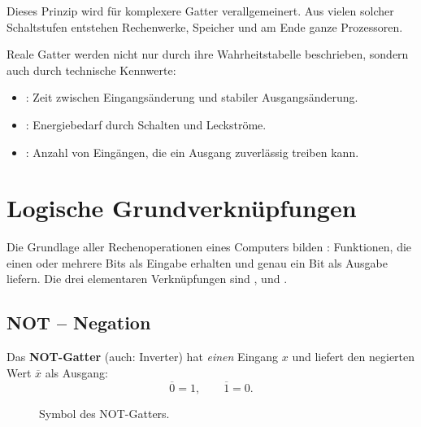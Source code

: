 Dieses Prinzip wird für komplexere Gatter verallgemeinert. Aus vielen solcher Schaltstufen entstehen Rechenwerke, Speicher und am Ende ganze Prozessoren.

\begin{mydefinition}
    Reale Gatter werden nicht nur durch ihre Wahrheitstabelle beschrieben, sondern auch durch technische Kennwerte:
    \begin{itemize}
        \item {}: Zeit zwischen Eingangsänderung und stabiler Ausgangsänderung.
        \item {}: Energiebedarf durch Schalten und Leckströme.
        \item {}: Anzahl von Eingängen, die ein Ausgang zuverlässig treiben kann.
    \end{itemize}
\end{mydefinition}

\section{Logische Grundverknüpfungen}

Die Grundlage aller Rechenoperationen eines Computers bilden : Funktionen, die einen oder mehrere Bits als Eingabe erhalten und genau ein Bit als Ausgabe liefern. Die drei elementaren Verknüpfungen sind ,  und .

\subsection{NOT -- Negation}

\begin{mydefinition}
    Das \textbf{NOT-Gatter} (auch: Inverter) hat \emph{einen} Eingang $x$ und liefert den negierten Wert $\overline{x}$ als Ausgang:
    \[
        \overline{0} = 1, \qquad \overline{1} = 0.
    \]
\end{mydefinition}

\begin{figure}[H]
    \centering
    \caption{Symbol des NOT-Gatters.}
    \label{fig:not_gatter}
\end{figure}

